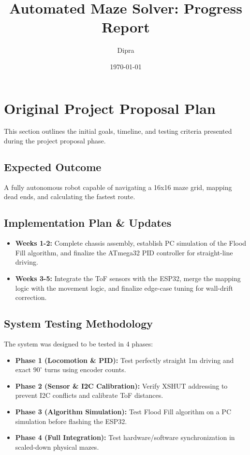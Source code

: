 \documentclass[12pt,a4paper]{article}
\title{Automated Maze Solver: Progress Report}
\author{Dipra}
\date{\today}
\begin{document}
\maketitle

\section{Original Project Proposal Plan}
This section outlines the initial goals, timeline, and testing criteria presented during the project proposal phase.

\subsection{Expected Outcome}
A fully autonomous robot capable of navigating a 16x16 maze grid, mapping dead ends, and calculating the fastest route.

\subsection{Implementation Plan \& Updates}
\begin{itemize}
    \item \textbf{Weeks 1-2:} Complete chassis assembly, establish PC simulation of the Flood Fill algorithm, and finalize the ATmega32 PID controller for straight-line driving.
    \item \textbf{Weeks 3-5:} Integrate the ToF sensors with the ESP32, merge the mapping logic with the movement logic, and finalize edge-case tuning for wall-drift correction.
\end{itemize}

\subsection{System Testing Methodology}
The system was designed to be tested in 4 phases:
\begin{itemize}
    \item \textbf{Phase 1 (Locomotion \& PID):} Test perfectly straight 1m driving and exact $90^\circ$ turns using encoder counts.
    \item \textbf{Phase 2 (Sensor \& I2C Calibration):} Verify XSHUT addressing to prevent I2C conflicts and calibrate ToF distances.
    \item \textbf{Phase 3 (Algorithm Simulation):} Test Flood Fill algorithm on a PC simulation before flashing the ESP32.
    \item \textbf{Phase 4 (Full Integration):} Test hardware/software synchronization in scaled-down physical mazes.
\end{itemize}
\end{document}
